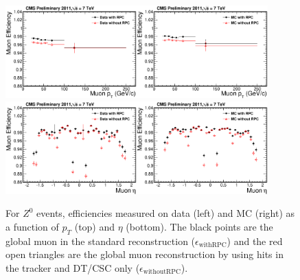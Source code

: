 \documentclass{JINST}
\begin{document}
\begin{figure}
  \begin{center}
    \texttt{\includegraphics[width=0.45\textwidth]{AbsEff_pt_Data}}\hspace{0.5cm}\texttt{\includegraphics[width=0.45\textwidth]{AbsEff_pt_MC}}
    \texttt{\includegraphics[width=0.45\textwidth]{AbsEff_eta_Data}}\hspace{0.5cm}\texttt{\includegraphics[width=0.45\textwidth]{AbsEff_eta_MC}}
    \caption{
    For $Z^{0}$ events, efficiencies measured on data (left) and MC (right) as a function of $p_T$ (top) and $\eta$ (bottom).
    The black points are the global muon in the standard reconstruction ($\epsilon_{\mathrm{withRPC}}$) and the red open triangles are the global muon reconstruction by using hits in the tracker and DT/CSC only ($\epsilon_{\mathrm{withoutRPC}}$).
    }
    \label{fig:muEffAbs}
    \vspace{-0.4cm}
  \end{center}
\end{figure}
\end{document}
